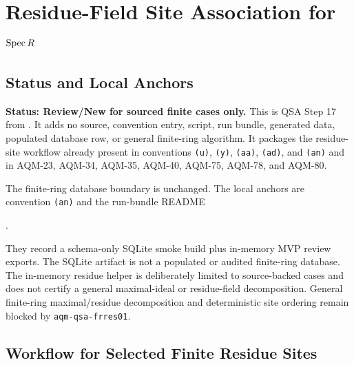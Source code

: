 
\section{Residue-Field Site Association for \texorpdfstring{\(\operatorname{Spec} R\)}{Spec R}}
\label{sec:qsa-residue-field-site-association}

\subsection{Status and Local Anchors}

\textbf{Status: Review/New for sourced finite cases only.}  This is QSA
Step 17 from .  It adds no
source, convention entry, script, run bundle, generated data, populated
database row, or general finite-ring algorithm.  It packages the residue-site
workflow already present in conventions \texttt{(u)}, \texttt{(y)},
\texttt{(aa)}, \texttt{(ad)}, and \texttt{(an)} and in AQM-23, AQM-34,
AQM-35, AQM-40, AQM-75, AQM-78, and AQM-80.

The finite-ring database boundary is unchanged.  The local anchors are
convention \texttt{(an)} and the run-bundle README
\begin{center}
  .
\end{center}
They record a schema-only SQLite smoke build plus in-memory MVP review exports.
The SQLite artifact is not a populated or audited finite-ring database.  The
in-memory residue helper is deliberately limited to source-backed cases and
does not certify a general maximal-ideal or residue-field decomposition.
General finite-ring maximal/residue decomposition and deterministic site
ordering remain blocked by \texttt{aqm-qsa-frres01}.

\subsection{Workflow for Selected Finite Residue Sites}

